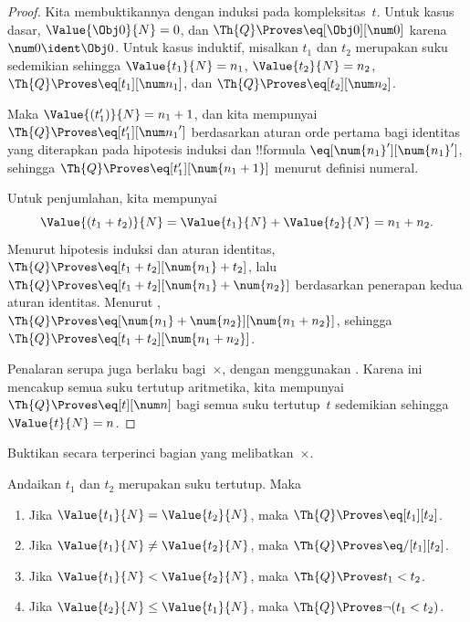 \documentclass[../../../include/open-logic-section]{subfiles}
\begin{document}
\begin{proof}
Kita membuktikannya dengan induksi pada kompleksitas~$t$. Untuk kasus dasar,
$\Value{\Obj 0}{N} = 0$, dan $\Th{Q} \Proves \eq[\Obj 0][\num 0]$ karena
$\num 0 \ident \Obj 0$.
%
Untuk kasus induktif, misalkan $t_1$ dan $t_2$ merupakan suku sedemikian
sehingga $\Value{t_1}{N} = n_1$, $\Value{t_2}{N} = n_2$,
$\Th{Q} \Proves \eq[t_1][\num n_1]$, dan
$\Th{Q} \Proves \eq[t_2][\num n_2]$.

Maka $\Value{(t_1')}{N} = n_1 + 1$, dan kita mempunyai
$\Th{Q} \Proves \eq[t_1'][{\num n_1}']$ berdasarkan aturan orde pertama
bagi identitas yang diterapkan pada hipotesis induksi dan !!{formula}
$\eq[\num{n_1}'][\num{n_1}']$, sehingga
$\Th{Q} \Proves \eq[t_1'][\num{n_1 + 1}]$ menurut definisi numeral.

Untuk penjumlahan, kita mempunyai
\[
      \Value{(t_1 + t_2)}{N}
    = \Value{t_1}{N} + \Value{t_2}{N}
    = n_1 + n_2.
\]
Menurut hipotesis induksi dan aturan identitas,
$\Th{Q} \Proves \eq[t_1 + t_2][\num{n_1} + t_2]$, lalu
$\Th{Q} \Proves \eq[t_1 + t_2][\num{n_1} + \num{n_2}]$
berdasarkan penerapan kedua aturan identitas. Menurut
,
$\Th{Q} \Proves \eq[\num{n_1} + \num{n_2}][\num{n_1 + n_2}]$, sehingga
$\Th{Q} \Proves \eq[t_1 + t_2][\num{n_1 + n_2}]$.

Penalaran serupa juga berlaku bagi~$\times$, dengan menggunakan
.
%
Karena ini mencakup semua suku tertutup aritmetika, kita mempunyai
$\Th{Q} \Proves \eq[t][\num n]$ bagi semua suku tertutup~$t$ sedemikian
sehingga $\Value{t}{N} = n$.
\end{proof}

\begin{prob}
Buktikan secara terperinci bagian  yang
melibatkan~$\times$.
\end{prob}

\begin{lem}
Andaikan $t_1$ dan $t_2$ merupakan suku tertutup. Maka
\begin{enumerate}
\item Jika $\Value{t_1}{N} = \Value{t_2}{N}$,
    maka $\Th{Q} \Proves \eq[t_1][t_2]$.
\item Jika $\Value{t_1}{N} \neq \Value{t_2}{N}$,
    maka $\Th{Q} \Proves \eq/[t_1][t_2]$.
\item Jika $\Value{t_1}{N} < \Value{t_2}{N}$,
    maka $\Th{Q} \Proves t_1 < t_2$.
\item Jika $\Value{t_2}{N} \leq \Value{t_1}{N}$,
    maka $\Th{Q} \Proves \lnot(t_1 < t_2)$.
\end{enumerate}
\end{lem}
\end{document}
